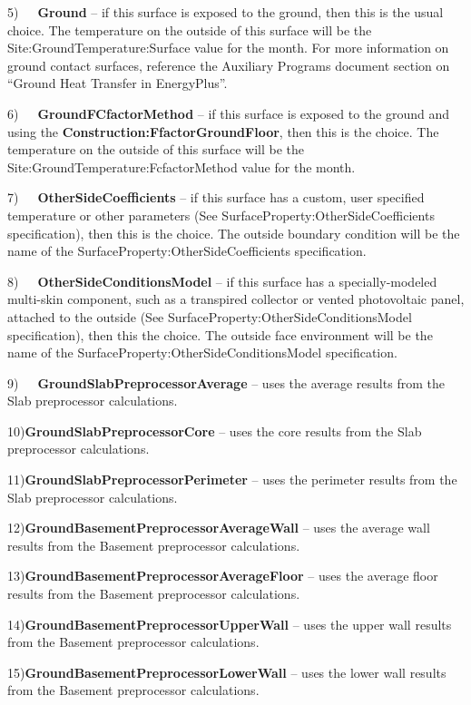 5)~~~\textbf{Ground} -- if this surface is exposed to the ground, then this is the usual choice. The temperature on the outside of this surface will be the Site:GroundTemperature:Surface value for the month. For more information on ground contact surfaces, reference the Auxiliary Programs document section on ``Ground Heat Transfer in EnergyPlus''.

6)~~~\textbf{GroundFCfactorMethod} -- if this surface is exposed to the ground and using the \textbf{Construction:FfactorGroundFloor}, then this is the choice. The temperature on the outside of this surface will be the Site:GroundTemperature:FcfactorMethod value for the month.

7)~~~\textbf{OtherSideCoefficients} -- if this surface has a custom, user specified temperature or other parameters (See SurfaceProperty:OtherSideCoefficients specification), then this is the choice. The outside boundary condition will be the name of the SurfaceProperty:OtherSideCoefficients specification.

8)~~~\textbf{OtherSideConditionsModel} -- if this surface has a specially-modeled multi-skin component, such as a transpired collector or vented photovoltaic panel, attached to the outside (See SurfaceProperty:OtherSideConditionsModel specification), then this the choice. The outside face environment will be the name of the SurfaceProperty:OtherSideConditionsModel specification.

9)~~~\textbf{GroundSlabPreprocessorAverage} -- uses the average results from the Slab preprocessor calculations.

10)\textbf{GroundSlabPreprocessorCore} -- uses the core results from the Slab preprocessor calculations.

11)\textbf{GroundSlabPreprocessorPerimeter} -- uses the perimeter results from the Slab preprocessor calculations.

12)\textbf{GroundBasementPreprocessorAverageWall} -- uses the average wall results from the Basement preprocessor calculations.

13)\textbf{GroundBasementPreprocessorAverageFloor} -- uses the average floor results from the Basement preprocessor calculations.

14)\textbf{GroundBasementPreprocessorUpperWall} -- uses the upper wall results from the Basement preprocessor calculations.

15)\textbf{GroundBasementPreprocessorLowerWall} -- uses the lower wall results from the Basement preprocessor calculations.

